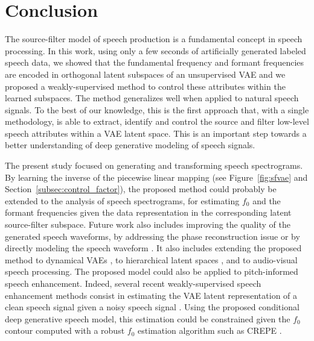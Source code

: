 \documentclass[review]{elsarticle}
\begin{document}
\section{Conclusion}
\label{sec:conclusion}

The source-filter model of speech production is a fundamental concept in speech processing. In this work, using only a few seconds of artificially generated labeled speech data, we showed that the fundamental frequency and formant frequencies are encoded in orthogonal latent subspaces of an unsupervised VAE and we proposed a weakly-supervised method to control these attributes within the learned subspaces. The method generalizes well when applied to natural speech signals. To the best of our knowledge, this is the first approach that, with a single methodology, is able to extract, identify and control the source and filter low-level speech attributes within a VAE latent space. This is an important step towards a better understanding of deep generative modeling of speech signals. 

The present study focused on generating and transforming speech spectrograms. By learning the inverse of the piecewise linear mapping (see Figure~\ref{fig:sfvae} and Section~\ref{subsec:control_factor}), the proposed method could probably be extended to the analysis of speech spectrograms, for estimating $f_0$ and the formant frequencies given the data representation in the corresponding latent source-filter subspace. Future work also includes improving the quality of the generated speech waveforms, by addressing the phase reconstruction issue or by directly modeling the speech waveform \citep{caillon2021rave}. It also includes extending the proposed method to dynamical VAEs \citep{girin2020dynamical}, to hierarchical latent spaces \citep{vahdat2020nvae}, and to audio-visual speech processing. The proposed model could also be applied to pitch-informed speech enhancement. Indeed, several recent weakly-supervised speech enhancement methods consist in estimating the VAE latent representation of a clean speech signal given a noisy speech signal \citep{bando2018statistical,leglaive_MLSP18, BayesianMVAE, Leglaive_ICASSP2019a,Leglaive_ICASSP2019b, parienteInterspeech19, leglaive2020recurrent, richter2020speech,carbajal2021guided, fang2021variational}. Using the proposed conditional deep generative speech model, this estimation could be constrained given the $f_0$ contour computed with a robust $f_0$ estimation algorithm such as CREPE \citep{kim2018crepe}.

\end{document}
